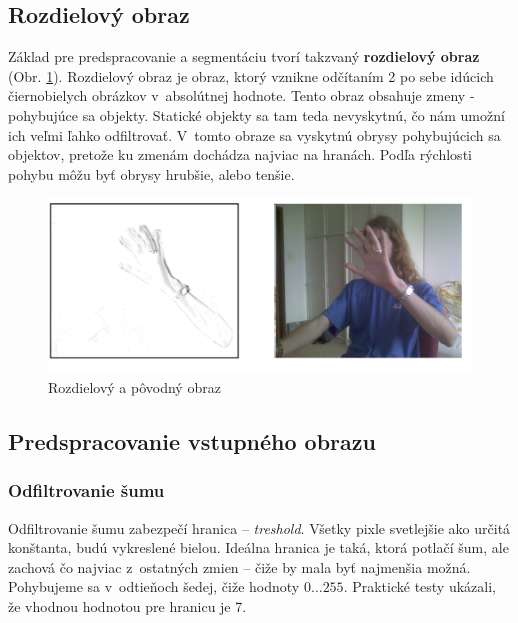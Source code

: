 \subsection{Rozdielový obraz}
\label{chap:diffimg}

Základ pre predspracovanie a segmentáciu tvorí takzvaný \textbf{rozdielový obraz} (Obr. \ref{fig:rozdielovy_obr}). Rozdielový obraz je obraz, ktorý vznikne odčítaním 2 po sebe idúcich čiernobielych obrázkov v~absolútnej hodnote. Tento obraz obsahuje zmeny - pohybujúce sa objekty. Statické objekty sa tam teda nevyskytnú, čo nám umožní ich veľmi ľahko odfiltrovať. V~tomto obraze sa vyskytnú obrysy pohybujúcich sa objektov, pretože ku zmenám dochádza najviac na hranách. Podľa rýchlosti pohybu môžu byť obrysy hrubšie, alebo tenšie. 


\begin{figure}[h]
  \begin{center}
    \includegraphics[width=\textwidth]{images/rozdielovy}
  \end{center}
  \caption{Rozdielový a pôvodný obraz}
  \label{fig:rozdielovy_obr}
\end{figure}


\subsection{Predspracovanie vstupného obrazu}
\label{chap:preprocess}

\subsubsection{Odfiltrovanie šumu}
Odfiltrovanie šumu zabezpečí hranica -- \textit{treshold}. Všetky pixle svetlejšie ako určitá konštanta, budú vykreslené bielou. Ideálna hranica je taká, ktorá potlačí šum, ale zachová čo najviac z~ostatných zmien -- čiže by mala byť najmenšia možná. Pohybujeme sa v~odtieňoch šedej, čiže hodnoty $0\dots 255$. Praktické testy ukázali, že vhodnou hodnotou pre hranicu je 7.

